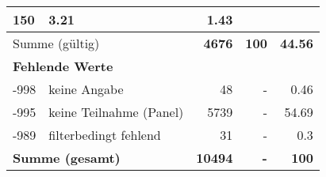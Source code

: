 \begin{longtable}{lXrrr}
       \num{150} &
       \num[round-mode=places,round-precision=2]{3.21} &
         \num[round-mode=places,round-precision=2]{1.43} \\
     \midrule
     \multicolumn{2}{l}{Summe (gültig)} &
       \textbf{\num{4676}} &
     \textbf{\num{100}} &
       \textbf{\num[round-mode=places,round-precision=2]{44.56}} \\
     \multicolumn{5}{l}{\textbf{Fehlende Werte}}\\
       -998 &
       keine Angabe &
         \num{48} &
        - &
         \num[round-mode=places,round-precision=2]{0.46} \\
       -995 &
       keine Teilnahme (Panel) &
         \num{5739} &
        - &
         \num[round-mode=places,round-precision=2]{54.69} \\
       -989 &
       filterbedingt fehlend &
         \num{31} &
        - &
         \num[round-mode=places,round-precision=2]{0.3} \\
     \midrule
     \multicolumn{2}{l}{\textbf{Summe (gesamt)}} &
          \textbf{\num{10494}} &
        \textbf{-} &
        \textbf{\num{100}} \\
     \bottomrule
     \end{longtable}
     
